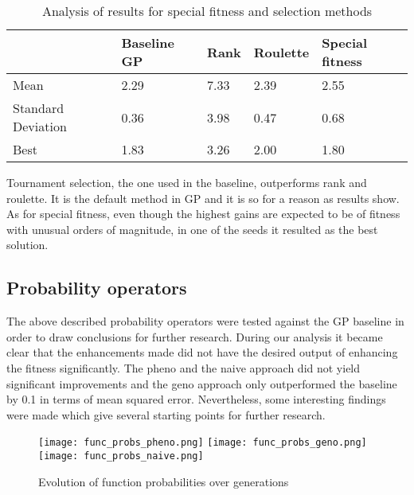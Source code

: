 \documentclass[12pt]{article}
\begin{document}
\begin{table}[h!]
\centering
\begin{tabular}{l || l l l l}
 \hline
  & Baseline GP & Rank & Roulette & Special fitness   \\ [0.5ex]
 \hline\hline
 Mean & \cellcolor{green!25}2.29 & 	\cellcolor{red!25}7.33 & 	2.39 & 2.55 \\
 Standard Deviation & \cellcolor{green!25}0.36 & \cellcolor{red!25}3.98 & 0.47 & 0.68\\
 Best & 1.83 & \cellcolor{red!25}3.26 & 2.00 & \cellcolor{green!25}1.80 \\
 \hline
\end{tabular}
\caption{Analysis of results for special fitness and selection methods}
\label{table_others}
\end{table}
\noindent
Tournament selection, the one used in the baseline, outperforms rank and roulette. It is the default method in GP and it is so for a reason as results show.  \hfill \break
As for special fitness, even though the highest gains are expected to be of fitness with unusual orders of magnitude, in one of the seeds it resulted as the best solution.
\vspace*{40px}
\subsection*{Probability operators}
The above described probability operators were tested against the GP baseline in order to draw conclusions for further research. During our analysis it became clear that the enhancements made did not have the desired output of enhancing the fitness significantly. The pheno and the naive approach did not yield significant improvements and the geno approach only outperformed the baseline by 0.1 in terms of mean squared error. Nevertheless, some interesting findings were made which give several starting points for further research.\break


\begin{figure}[H]
\begin{center}
\texttt{[image: func\_probs\_pheno.png]}
\texttt{[image: func\_probs\_geno.png]}
\texttt{[image: func\_probs\_naive.png]}
\end{center}
\caption{Evolution of function probabilities over generations}
\centering
\end{figure}

\end{document}
